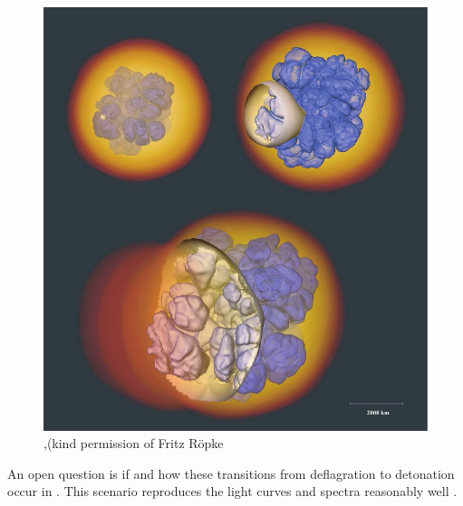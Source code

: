 \begin{figure}[htbp] %
   \centering
   \includegraphics[width=\textwidth]{chapter_intro/plots/ddt_roepke08.pdf}
   \caption{ \citet{2008NJPh...10l5009R},(kind permission of Fritz R\"{o}pke}
   \label{fig:snia_ddt_roepke2007}
\end{figure}

An open question is if and how these transitions from deflagration to detonation occur in \sneia. This scenario reproduces the light curves and spectra reasonably well \citep{2009Natur.460..869K}. 


